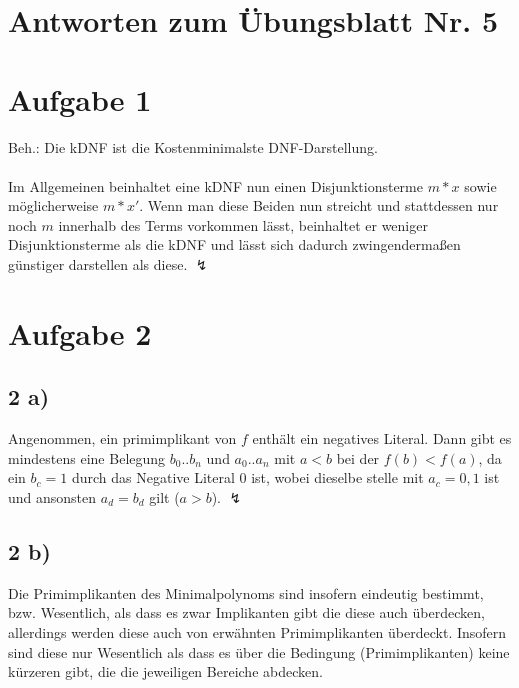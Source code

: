 \documentclass{scrartcl}
\begin{document}
    \section*{Antworten zum Übungsblatt Nr. 5}

        \section*{Aufgabe 1}
            Beh.: Die kDNF ist die Kostenminimalste DNF-Darstellung. \\ \\
            Im Allgemeinen beinhaltet eine kDNF nun einen Disjunktionsterme $m*x$ sowie möglicherweise $m*x'$.
            Wenn man diese Beiden nun streicht und stattdessen nur noch $m$ innerhalb des Terms vorkommen lässt,
            beinhaltet er weniger Disjunktionsterme als die kDNF und lässt sich dadurch zwingendermaßen günstiger
            darstellen als diese. $ \lightning $


        \section*{Aufgabe 2}
        \subsection*{2 a)}
            Angenommen, ein primimplikant von $f$ enthält ein negatives Literal. Dann gibt es mindestens eine
            Belegung $b_0..b_n$ und $a_0..a_n$ mit $a < b$ bei der $f(b) < f(a)$, da ein $b_c = 1$ durch das 
            Negative Literal $0$ ist, wobei dieselbe stelle mit $a_c = 0, 1$ ist und ansonsten 
            $a_d = b_d$ gilt ($a > b$). $\lightning$

        \subsection*{2 b)}
            Die Primimplikanten des Minimalpolynoms sind insofern eindeutig bestimmt, bzw.
            Wesentlich, als dass es zwar Implikanten gibt die diese auch überdecken, allerdings
            werden diese auch von erwähnten Primimplikanten überdeckt. Insofern sind diese nur
            Wesentlich als dass es über die Bedingung (Primimplikanten) keine kürzeren gibt,
            die die jeweiligen Bereiche abdecken.
\end{document}

